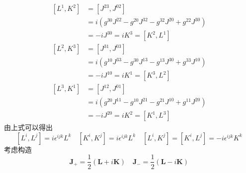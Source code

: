 \documentclass{article}
\begin{document}
\begin{align}
\left[L^1, K^2 \right]	&=\left[J^{2 3}, J^{0 2} \right] \nonumber \\
						&= i(g^{3 0} J^{2 2} - g^{2 0} J^{3 2}-g^{3 2} J^{2 0}+g^{2 2} J^{3 0})	\nonumber \\
						&= - iJ^{30} = iK^{3} = \left[K^2, L^1 \right] \nonumber \\	
\left[L^2, K^3 \right]	&=\left[J^{3 1}, J^{0 3} \right] \nonumber \\	
						&= i(g^{1 0} J^{3 3} - g^{3 0} J^{1 3}-g^{1 3} J^{3 0}+g^{3 3} J^{1 0}) \nonumber \\
						&= - iJ^{10} = iK^{1} = \left[K^3, L^2 \right] \nonumber \\		
\left[L^3, K^1 \right]	&=\left[J^{1 2}, J^{0 1} \right] \nonumber \\	
						&= i(g^{2 0} J^{1 1} - g^{1 0} J^{2 1}-g^{2 1} J^{1 0}+g^{1 1} J^{2 0})  \nonumber \\
						&= - iJ^{20} = iK^{2} = \left[K^1, L^3 \right] \nonumber 	
\end{align}
由上式可以得出
$$
\left[ L^{i}, L^{j} \right] = i \epsilon^{ijk} L^{k} \quad \left[ K^{i}, K^{j} \right] = i \epsilon^{ijk} L^{k}
\quad \left[ L^{i}, K^{j} \right]=\left[ K^{i},L^{j}  \right] = -i \epsilon^{ijk} K^{k}
$$
考虑构造$$
\mathbf{J}_{+} = \frac{1}{2}(\mathbf{L} + i \mathbf{K}) \quad \mathbf{J}_{-} = \frac{1}{2}(\mathbf{L} - i \mathbf{K}) 
$$
\end{document}
